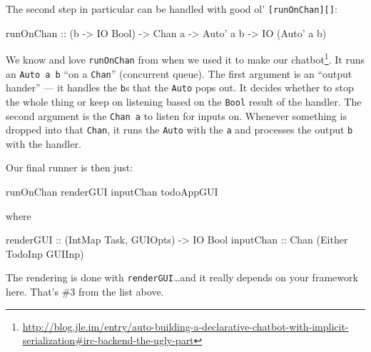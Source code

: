 \documentclass[]{article}
\newenvironment{Shaded}{}{}
\newcommand{\DataTypeTok}[1]{\textcolor[rgb]{0.56,0.13,0.00}{{#1}}}
\newcommand{\OtherTok}[1]{\textcolor[rgb]{0.00,0.44,0.13}{{#1}}}
\newcommand{\NormalTok}[1]{{#1}}
\renewcommand{\href}[2]{#2\footnote{\url{#1}}}
\begin{document}
The second step in particular can be handled with good ol'
\texttt{{[}runOnChan{]}{[}{]}}:

\begin{Shaded}
\begin{Highlighting}[]
\OtherTok{runOnChan ::} \NormalTok{(b }\OtherTok{->} \DataTypeTok{IO} \DataTypeTok{Bool}\NormalTok{) }\OtherTok{->} \DataTypeTok{Chan} \NormalTok{a }\OtherTok{->} \DataTypeTok{Auto'} \NormalTok{a b }\OtherTok{->} \DataTypeTok{IO} \NormalTok{(}\DataTypeTok{Auto'} \NormalTok{a b)}
\end{Highlighting}
\end{Shaded}

We know and love \texttt{runOnChan} from when we used it to make our
\href{http://blog.jle.im/entry/auto-building-a-declarative-chatbot-with-implicit-serialization\#irc-backend-the-ugly-part}{chatbot}.
It runs an \texttt{Auto\textquotesingle{}\ a\ b} ``on a \texttt{Chan}''
(concurrent queue). The first argument is an ``output hander'' --- it
handles the \texttt{b}s that the \texttt{Auto\textquotesingle{}} pops
out. It decides whether to stop the whole thing or keep on listening
based on the \texttt{Bool} result of the handler. The second argument is
the \texttt{Chan\ a} to listen for inputs on. Whenever something is
dropped into that \texttt{Chan}, it runs the
\texttt{Auto\textquotesingle{}} with the \texttt{a} and processes the
output \texttt{b} with the handler.

Our final runner is then just:

\begin{Shaded}
\begin{Highlighting}[]
\NormalTok{runOnChan renderGUI inputChan todoAppGUI}
\end{Highlighting}
\end{Shaded}

where

\begin{Shaded}
\begin{Highlighting}[]
\OtherTok{renderGUI ::} \NormalTok{(}\DataTypeTok{IntMap} \DataTypeTok{Task}\NormalTok{, }\DataTypeTok{GUIOpts}\NormalTok{) }\OtherTok{->} \DataTypeTok{IO} \DataTypeTok{Bool}
\OtherTok{inputChan ::} \DataTypeTok{Chan} \NormalTok{(}\DataTypeTok{Either} \DataTypeTok{TodoInp} \DataTypeTok{GUIInp}\NormalTok{)}
\end{Highlighting}
\end{Shaded}

The rendering is done with \texttt{renderGUI}\ldots{}and it really
depends on your framework here. That's \#3 from the list above.
\end{document}
